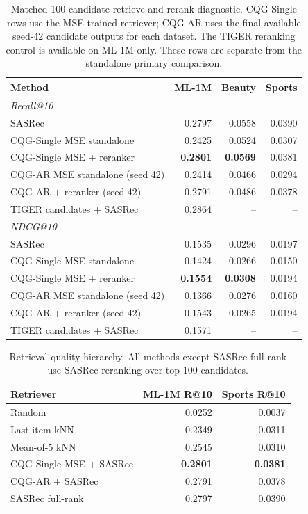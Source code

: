 \documentclass[letterpaper]{article}
\begin{document}
\begin{table}[H]
\centering
\small
\begin{tabular}{lrrr}
\toprule
Method & ML-1M & Beauty & Sports \\
\midrule
\multicolumn{4}{l}{\textit{Recall@10}} \\
SASRec & 0.2797 & 0.0558 & 0.0390 \\
CQG-Single MSE standalone & 0.2425 & 0.0524 & 0.0307 \\
CQG-Single MSE + reranker & \textbf{0.2801} & \textbf{0.0569} & 0.0381 \\
CQG-AR MSE standalone (seed 42) & 0.2414 & 0.0466 & 0.0294 \\
CQG-AR + reranker (seed 42) & 0.2791 & 0.0486 & 0.0378 \\
TIGER candidates + SASRec & 0.2864 & -- & -- \\
\midrule
\multicolumn{4}{l}{\textit{NDCG@10}} \\
SASRec & 0.1535 & 0.0296 & 0.0197 \\
CQG-Single MSE standalone & 0.1424 & 0.0266 & 0.0150 \\
CQG-Single MSE + reranker & \textbf{0.1554} & \textbf{0.0308} & 0.0194 \\
CQG-AR MSE standalone (seed 42) & 0.1366 & 0.0276 & 0.0160 \\
CQG-AR + reranker (seed 42) & 0.1543 & 0.0265 & 0.0194 \\
TIGER candidates + SASRec & 0.1571 & -- & -- \\
\bottomrule
\end{tabular}
\caption{Matched 100-candidate retrieve-and-rerank diagnostic. CQG-Single rows
use the MSE-trained retriever; CQG-AR uses the final available seed-42
candidate outputs for each dataset. The TIGER reranking control is available
on ML-1M only. These rows are separate from the standalone primary comparison.}
\label{tab:cross}
\end{table}

\begin{table}[H]
\centering
\small
\begin{tabular}{lrr}
\toprule
Retriever & ML-1M R@10 & Sports R@10 \\
\midrule
Random & 0.0252 & 0.0037 \\
Last-item kNN & 0.2349 & 0.0311 \\
Mean-of-5 kNN & 0.2545 & 0.0310 \\
CQG-Single MSE + SASRec & \textbf{0.2801} & \textbf{0.0381} \\
CQG-AR + SASRec & 0.2791 & 0.0378 \\
SASRec full-rank & 0.2797 & 0.0390 \\
\bottomrule
\end{tabular}
\caption{Retrieval-quality hierarchy. All methods except SASRec full-rank use
SASRec reranking over top-100 candidates.}
\label{tab:hierarchy}
\end{table}
\end{document}
